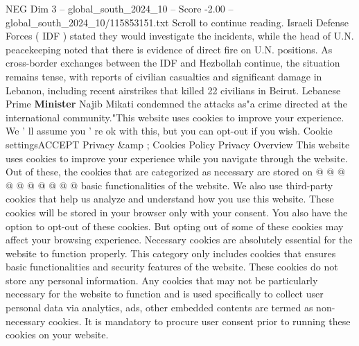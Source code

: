 \begin{textsample}{NEG Dim 3 – global\_south\_2024\_10 – Score -2.00 – global\_south\_2024\_10/115853151.txt}
Scroll to continue reading.
Israeli Defense Forces ( IDF ) stated they would investigate the incidents, while the head of U.N. peacekeeping noted that there is evidence of direct fire on U.N. positions.
As cross-border exchanges between the IDF and Hezbollah continue, the situation remains tense, with reports of civilian casualties and significant damage in Lebanon, including recent airstrikes that killed 22 civilians in Beirut.
Lebanese Prime \textbf{Minister} Najib Mikati condemned the attacks as"a crime directed at the international community."This website uses cookies to improve your experience.
We ' ll assume you ' re ok with this, but you can opt-out if you wish.
Cookie settingsACCEPT Privacy \&amp ; Cookies Policy Privacy Overview This website uses cookies to improve your experience while you navigate through the website.
Out of these, the cookies that are categorized as necessary are stored on @ @ @ @ @ @ @ @ @ @ basic functionalities of the website.
We also use third-party cookies that help us analyze and understand how you use this website.
These cookies will be stored in your browser only with your consent.
You also have the option to opt-out of these cookies.
But opting out of some of these cookies may affect your browsing experience.
Necessary cookies are absolutely essential for the website to function properly.
This category only includes cookies that ensures basic functionalities and security features of the website.
These cookies do not store any personal information.
Any cookies that may not be particularly necessary for the website to function and is used specifically to collect user personal data via analytics, ads, other embedded contents are termed as non-necessary cookies.
It is mandatory to procure user consent prior to running these cookies on your website.

\end{textsample}
